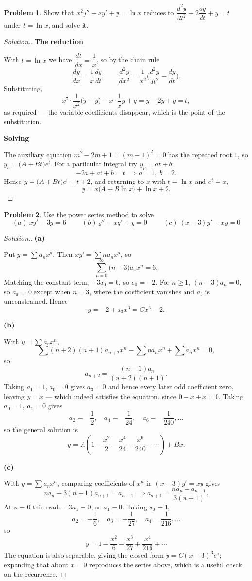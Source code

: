 \documentclass[11pt,a4paper]{article}
\theoremstyle{definition}
\newtheorem{problemx}{Problem}[subsection]
\newenvironment{problem}{\begin{problemx}}{\end{problemx}}
\newenvironment{solution}
  {\renewcommand{\qedsymbol}{}\begin{proof}[\textit{Solution}.]}
  {\end{proof}}
\newcommand{\subhead}[1]{%
  \par\medskip\noindent\textbf{#1}\par\nobreak\smallskip}
\begin{document}
\begin{problem}
Show that $x^2y''-xy'+y = \ln x$ reduces to
$\dfrac{d^2y}{dt^2} - 2\dfrac{dy}{dt} + y = t$ under $t = \ln x$, and solve it.
\end{problem}
\begin{solution}
\subhead{The reduction}
With $t = \ln x$ we have $\dfrac{dt}{dx} = \dfrac1x$, so by the chain rule
$$\frac{dy}{dx} = \frac1x\frac{dy}{dt},\qquad
\frac{d^2y}{dx^2} = \frac{1}{x^2}\Big(\frac{d^2y}{dt^2} - \frac{dy}{dt}\Big).$$
Substituting,
$$x^2\cdot\frac{1}{x^2}\Big(\ddot y - \dot y\Big) - x\cdot\frac1x\dot y + y
= \ddot y - 2\dot y + y = t ,$$
as required --- the variable coefficients disappear, which is the point of the
substitution.

\subhead{Solving}
The auxiliary equation $m^2-2m+1 = (m-1)^2 = 0$ has the repeated root $1$, so
$y_c = \big(A+Bt\big)e^{t}$. For a particular integral try $y_p = at+b$:
$$-2a + at + b = t \implies a = 1,\ b = 2 .$$
Hence $y = \big(A+Bt\big)e^{t} + t + 2$, and returning to $x$ with
$t = \ln x$ and $e^t = x$,
$$y = x\big(A + B\ln x\big) + \ln x + 2 .$$
\end{solution}

\begin{problem}
Use the power series method to solve
$$(a)\ xy'-3y = 6\hspace{1cm}(b)\ y''-xy'+y = 0\hspace{1cm}
(c)\ (x-3)y'-xy = 0$$
\end{problem}
\begin{solution}
\subhead{(a)}
Put $y = \sum a_nx^n$. Then $xy' = \sum na_nx^n$, so
$$\sum_{n=0}^{\infty}\big(n-3\big)a_nx^n = 6 .$$
Matching the constant term, $-3a_0 = 6$, so $a_0 = -2$. For $n\geq 1$,
$(n-3)a_n = 0$, so $a_n = 0$ except when $n = 3$, where the coefficient
vanishes and $a_3$ is unconstrained. Hence
$$y = -2 + a_3x^3 = Cx^3 - 2 .$$

\subhead{(b)}
With $y = \sum a_nx^n$,
$$\sum(n+2)(n+1)a_{n+2}x^n - \sum na_nx^n + \sum a_nx^n = 0 ,$$
so
$$a_{n+2} = \frac{(n-1)a_n}{(n+2)(n+1)} .$$
Taking $a_1 = 1$, $a_0 = 0$ gives $a_3 = 0$ and hence every later odd
coefficient zero, leaving $y = x$ --- which indeed satisfies the equation, since
$0 - x + x = 0$. Taking $a_0 = 1$, $a_1 = 0$ gives
$$a_2 = -\frac12,\quad a_4 = -\frac{1}{24},\quad a_6 = -\frac{1}{240},\dots$$
so the general solution is
$$y = A\left(1 - \frac{x^2}{2} - \frac{x^4}{24} - \frac{x^6}{240} - \cdots\right)
+ Bx .$$

\subhead{(c)}
With $y = \sum a_nx^n$, comparing coefficients of $x^n$ in
$(x-3)y' = xy$ gives
$$na_n - 3(n+1)a_{n+1} = a_{n-1}
\implies a_{n+1} = \frac{na_n - a_{n-1}}{3(n+1)} .$$
At $n=0$ this reads $-3a_1 = 0$, so $a_1 = 0$. Taking $a_0 = 1$,
$$a_2 = -\frac16,\quad a_3 = -\frac{1}{27},\quad a_4 = \frac{1}{216},\dots$$
so
$$y = 1 - \frac{x^2}{6} - \frac{x^3}{27} + \frac{x^4}{216} + \cdots$$
The equation is also separable, giving the closed form
$y = C(x-3)^3e^{x}$; expanding that about $x=0$ reproduces the series above,
which is a useful check on the recurrence.
\end{solution}
\end{document}
